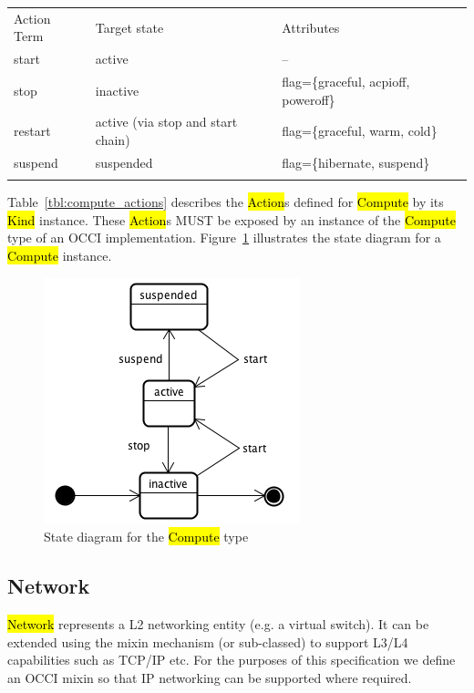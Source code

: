 \documentclass[10pt,a4paper]{article}
\begin{document}

{
	\begin{tabular}{lll}
	\toprule
	Action Term & Target state & Attributes \\
	\colrule
	start & active & -- \\
	stop & inactive & flag=\{graceful, acpioff, poweroff\} \\
	restart & active (via stop and start chain) & flag=\{graceful, warm, cold\} \\
	suspend & suspended & flag=\{hibernate, suspend\} \\
	\botrule
	\end{tabular}
}

Table~\ref{tbl:compute_actions} describes the \hl{Action}s defined for
\hl{Compute} by its \hl{Kind} instance. These \hl{Action}s MUST be exposed 
by an instance of the \hl{Compute} type of an OCCI implementation. 
Figure~\ref{fig:compute_state} illustrates the state diagram for a \hl{Compute} instance.

\begin{figure}[!h]
	\centering
	\includegraphics[scale=0.4]{figs/compute-state.png}
	\caption{State diagram for the \hl{Compute} type}
	\label{fig:compute_state}
\end{figure}

\subsection{Network}
\hl{Network} represents a L2 networking entity (e.g. a virtual switch). It can be extended using 
the mixin mechanism (or sub-classed) to support L3/L4 capabilities such as TCP/IP etc. 
For the purposes of this specification we define an OCCI mixin so that IP networking can be supported
where required. 
\end{document}
